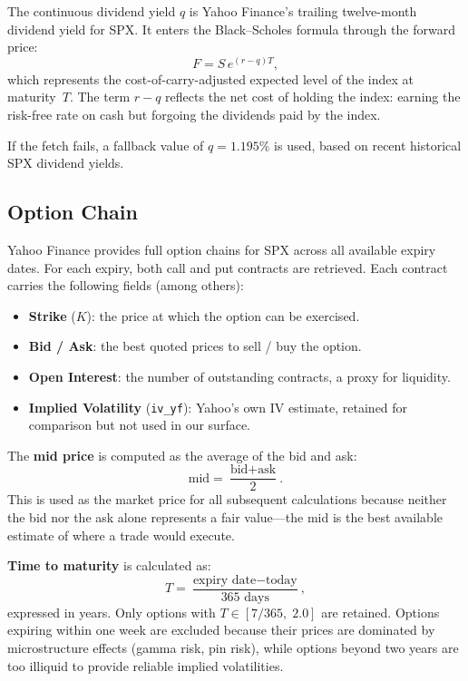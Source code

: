 \documentclass[12pt, a4paper]{article}
\begin{document}
The continuous dividend yield $q$ is Yahoo Finance's trailing twelve-month
dividend yield for SPX. It enters the Black--Scholes formula through the forward
price:
\begin{equation}
    F = S \, e^{(r - q) T},
    \label{eq:forward}
\end{equation}
which represents the cost-of-carry-adjusted expected level of the index at
maturity~$T$. The term $r - q$ reflects the net cost of holding the index:
earning the risk-free rate on cash but forgoing the dividends paid by the index.

If the fetch fails, a fallback value of $q = 1.195\%$ is used, based on recent
historical SPX dividend yields.

\subsection{Option Chain}

Yahoo Finance provides full option chains for SPX across all available expiry
dates. For each expiry, both call and put contracts are retrieved. Each contract
carries the following fields (among others):
\begin{itemize}[nosep]
    \item \textbf{Strike} ($K$): the price at which the option can be exercised.
    \item \textbf{Bid / Ask}: the best quoted prices to sell / buy the option.
    \item \textbf{Open Interest}: the number of outstanding contracts, a proxy
          for liquidity.
    \item \textbf{Implied Volatility} (\texttt{iv\_yf}): Yahoo's own IV
          estimate, retained for comparison but not used in our surface.
\end{itemize}

The \textbf{mid price} is computed as the average of the bid and ask:
\begin{equation}
    \text{mid} = \frac{\text{bid} + \text{ask}}{2}.
    \label{eq:mid}
\end{equation}
This is used as the market price for all subsequent calculations because neither
the bid nor the ask alone represents a fair value---the mid is the best available
estimate of where a trade would execute.

\textbf{Time to maturity} is calculated as:
\begin{equation}
    T = \frac{\text{expiry date} - \text{today}}{\text{365 days}},
    \label{eq:ttm}
\end{equation}
expressed in years. Only options with $T \in [7/365,\; 2.0]$ are retained.
Options expiring within one week are excluded because their prices are dominated
by microstructure effects (gamma risk, pin risk), while options beyond two years
are too illiquid to provide reliable implied volatilities.
\end{document}
